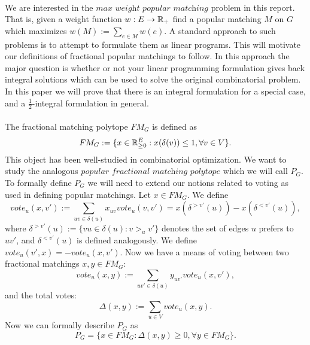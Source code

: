 \documentclass[letterpaper,12pt,oneside,onecolumn]{article}
\begin{document}
\paragraph{}
We are interested in the $\textit{max weight popular matching}$ problem in this report. That is, given a weight function $w: E \rightarrow \mathbb{R}_+$ find a popular matching $M$ on $G$ which maximizes $w(M) := \sum_{e \in M} w(e).$ A standard approach to such problems is to attempt to formulate them as linear programs. This will motivate our definitions of fractional popular matchings to follow. In this approach the major question is whether or not your linear programming formulation gives back integral solutions which can be used to solve the original combinatorial problem. In this paper we will prove that there is an integral formulation for a special case, and a $\frac{1}{2}$-integral formulation in general.
\paragraph{}
The fractional matching polytope $FM_{G}$ is defined as
$$FM_{G} := \{x \in \mathbb{R}_{\geq 0}^{E} : x(\delta(v)) \leq 1, \forall v \in V \}.$$
This object has been well-studied in combinatorial optimization. We want to study the analogous $\textit{popular fractional matching polytope}$ which we will call $P_G$. To formally define $P_G$ we will need to extend our notions related to voting as used in defining popular matchings. Let $x \in FM_G$. We define
$$vote_u(x, v') := \sum_{uv \in \delta(u)} x_{uv} vote_u(v,v') = x(\delta^{>v'}(u)) - x(\delta^{<v'}(u)),$$
where $\delta^{>v'}(u) := \{vu \in \delta(u) : v >_u v'\}$ denotes the set of edges $u$ prefers to $uv'$, and $\delta^{<v'}(u)$ is defined analogously.  We define $vote_u(v',x) = -vote_u(x,v')$. Now we have a means of voting between two fractional matchings $x,y \in FM_G$:
$$vote_u(x,y) := \sum_{uv' \in \delta(u)} y_{uv'}vote_u(x,v'), $$
and the total votes:
$$\Delta(x,y) := \sum_{u \in V} vote_u(x,y).$$
Now we can formally describe $P_G$ as 
$$P_G = \{ x\in FM_G: \Delta(x,y) \geq 0, \forall y \in FM_G\}.$$
\end{document}
